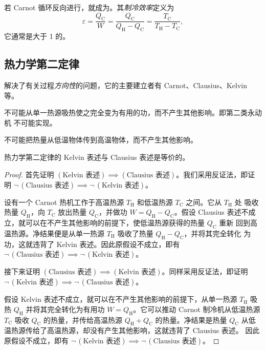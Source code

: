 若 Carnot 循环反向进行，就成为。其\emph{制冷效率}定义为
\begin{equation}
  \varepsilon = \frac{Q_\text{C}}{W}
  = \frac{Q_\text{C}}{Q_\text{H} - Q_\text{C}}
  = \frac{T_\text{C}}{T_\text{H} - T_\text{C}},
\end{equation}
它通常是大于 1 的。

\subsection{热力学第二定律}

解决了有关过程\emph{方向性}的问题，它的主要建立者有
Carnot、Clausius、Kelvin 等。

\begin{theorem}
  不可能从单一热源吸热使之完全变为有用的功，而不产生其他影响。即第二类永动机
  不可能实现。
\end{theorem}

\begin{theorem}
  不可能把热量从低温物体传到高温物体，而不产生其他影响。
\end{theorem}

热力学第二定律的 Kelvin 表述与 Clausius 表述是等价的。

\begin{proof} %
  \def\Clausius{(\text{Clausius 表述})} \def\Kelvin{(\text{Kelvin 表述})}
  \def\TH{T_\text{H}} \def\TC{T_\text{C}}
  \def\QH{Q_\text{H}} \def\QC{Q_\text{C}}

  首先证明 $\Kelvin\implies\Clausius$。我们采用反证法，即证明
  $\neg\,\Clausius \implies \neg\,\Kelvin$。

  设有一个 Carnot 热机工作于高温热源 $\TH$ 和低温热源 $\TC$ 之间。它从 $\TH$ 处
  吸收热量 $\QH$，向 $\TC$ 放出热量 $\QC$，并做功 $W=\QH-\QC$。假设 Clausius
  表述不成立，就可以在不产生其他影响的前提下，使低温热源获得的热量 $\QC$ 重新
  回到高温热源。净结果便是从单一热源 $\TH$ 吸收了热量 $\QH-\QC$，并将其完全转化
  为功，这就违背了 Kelvin 表述。因此原假设不成立，即有
  $\neg\,\Clausius \implies \neg\,\Kelvin$。

  接下来证明 $\Clausius\implies\Kelvin$。同样采用反证法，即证明
  $\neg\,\Kelvin \implies \neg\,\Clausius$。

  假设 Kelvin 表述不成立，就可以在不产生其他影响的前提下，从单一热源 $\TH$ 吸热
  $\QH$ 并将其完全转化为有用功 $W=\QH$。它可以推动 Carnot 制冷机从低温热源
  $\TC$ 吸收 $\QC$ 的热量，并传给高温热源 $\QH+\QC$ 的热量。净结果是热量 $\QC$
  从低温热源传给了高温热源，却没有产生其他影响，这就违背了 Clausius 表述。
  因此原假设不成立，即有
  $\neg\,\Kelvin \implies \neg\,\Clausius$。
\end{proof}


